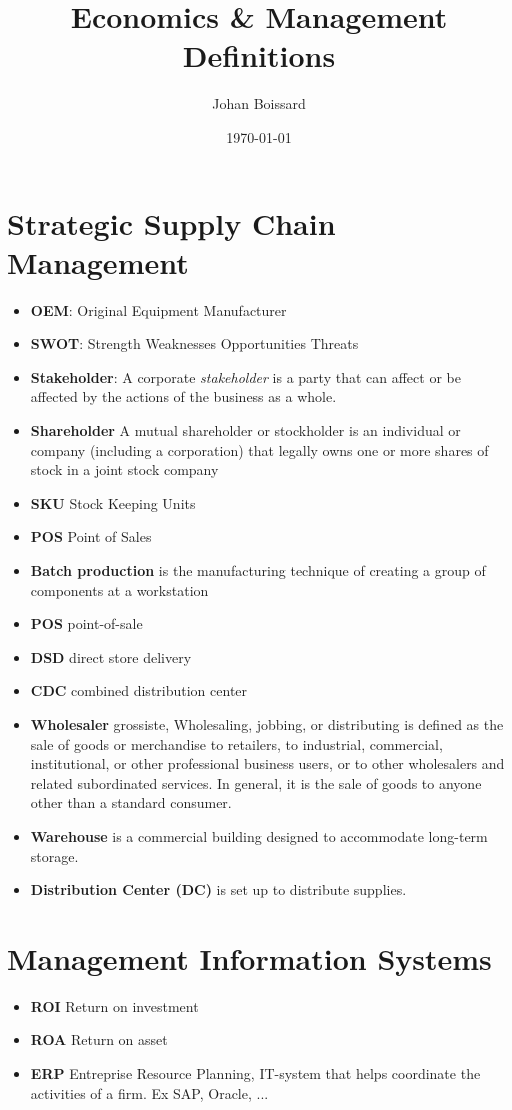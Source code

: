 \documentclass[a4paper,titlepage] {scrartcl}
\author{Johan Boissard}
\date{\today}
\title{Economics \& Management Definitions}
\begin{document}
\section{Strategic Supply Chain Management}

\begin{itemize}
	\item \textbf{OEM}: Original Equipment Manufacturer
	\item \textbf{SWOT}: Strength Weaknesses Opportunities Threats
	\item \textbf{Stakeholder}: A corporate \emph{stakeholder} is a party that can affect or be affected by the actions of the business as a whole.
	\item \textbf{Shareholder} A mutual shareholder or stockholder is an individual or company (including a corporation) that legally owns one or more shares of stock in a joint stock company
	\item \textbf{SKU} Stock Keeping Units
	\item \textbf{POS} Point of Sales
	\item \textbf{Batch production} is the manufacturing technique of creating a group of components at a workstation 
	\item \textbf{POS} point-of-sale
	\item \textbf{DSD} direct store delivery
	\item \textbf{CDC} combined distribution center
	\item \textbf{Wholesaler} grossiste, Wholesaling, 
	jobbing, or distributing is defined as the 
	sale of goods or merchandise to retailers, 
	to industrial, commercial, institutional,
	 or other professional business users, 
	or to other wholesalers and related 
	subordinated services. In general, 
	it is the sale of goods to anyone 
	other than a standard consumer.
	\item \textbf{Warehouse} is a commercial building designed to accommodate long-term storage.
	\item \textbf{Distribution Center (DC)} is set up to distribute supplies.
\end{itemize}

\section{Management Information Systems}
\begin{itemize}
	\item \textbf{ROI} Return on investment
	\item \textbf{ROA} Return on asset
	\item \textbf{ERP} Entreprise Resource Planning, IT-system that helps coordinate the activities of a firm. Ex SAP, Oracle, ...
\end{itemize}
\end{document}
